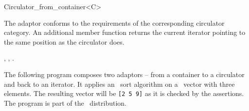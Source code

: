 \begin{ccRefClass}{Circulator_from_container<C>}
\ccOperations

The adaptor conforms to the requirements of the corresponding
circulator category. An additional member function
 returns the current iterator pointing to
the same position as the circulator does.

\ccSeeAlso

,
,
.

\ccExample

The following program composes two adaptors -- from a container to a
circulator and back to an iterator. It applies an \stl\ sort algorithm
on a \stl\ vector with three elements. The resulting vector will be
{\tt [2 5 9]} as it is checked by the assertions. The program is
part of the \cgal\ distribution.


\end{ccRefClass}

